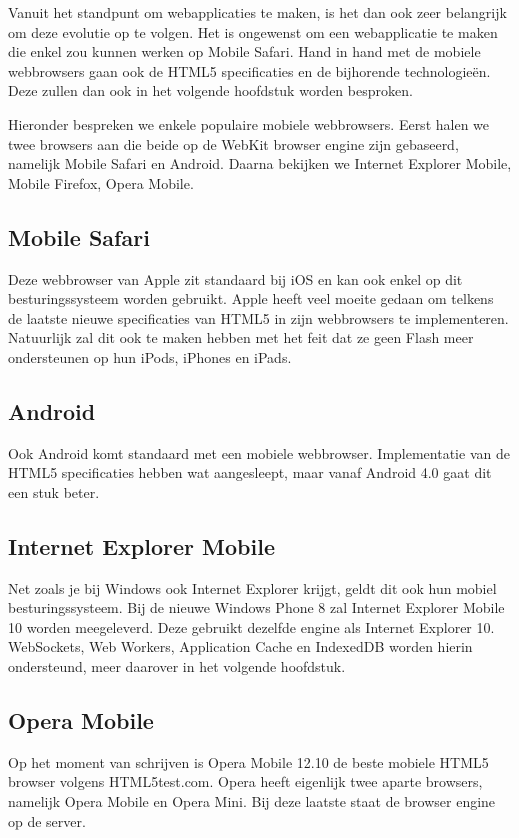 Vanuit het standpunt om webapplicaties te maken, is het dan ook zeer belangrijk om deze evolutie op te volgen. Het is ongewenst om een webapplicatie te maken die enkel zou kunnen werken op Mobile Safari. Hand in hand met de mobiele webbrowsers gaan ook de HTML5 specificaties en de bijhorende technologieën. Deze zullen dan ook in het volgende hoofdstuk worden besproken.

Hieronder bespreken we enkele populaire mobiele webbrowsers. Eerst halen we twee browsers aan die beide op de WebKit browser engine zijn gebaseerd, namelijk Mobile Safari en Android. Daarna bekijken we Internet Explorer Mobile, Mobile Firefox, Opera Mobile.

\subsection{Mobile Safari}
\label{sec:mobile-safari}
Deze webbrowser van Apple zit standaard bij iOS en kan ook enkel op dit besturingssysteem worden gebruikt. Apple heeft veel moeite gedaan om telkens de laatste nieuwe specificaties van HTML5 in zijn webbrowsers te implementeren. Natuurlijk zal dit ook te maken hebben met het feit dat ze geen Flash meer ondersteunen op hun iPods, iPhones en iPads.

\subsection{Android}
\label{sec:android-browser}
Ook Android komt standaard met een mobiele webbrowser. Implementatie van de HTML5 specificaties hebben wat aangesleept, maar vanaf Android 4.0 gaat dit een stuk beter.

\subsection{Internet Explorer Mobile}
Net zoals je bij Windows ook Internet Explorer krijgt, geldt dit ook hun mobiel  besturingssysteem. Bij de nieuwe Windows Phone 8 zal Internet Explorer Mobile 10 worden meegeleverd. Deze gebruikt dezelfde engine als Internet Explorer 10. WebSockets, Web Workers, Application Cache en IndexedDB worden hierin ondersteund, meer daarover in het volgende hoofdstuk.

\subsection{Opera Mobile}
Op het moment van schrijven is Opera Mobile 12.10 de beste mobiele HTML5 browser volgens HTML5test.com. Opera heeft eigenlijk twee aparte browsers, namelijk Opera Mobile en Opera Mini. Bij deze laatste staat de browser engine op de server.

